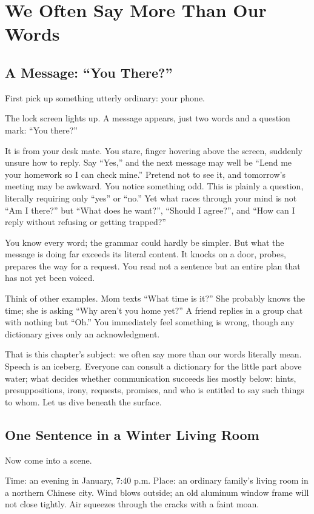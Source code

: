 \chapter{We Often Say More Than Our Words}
\section{A Message: ``You There?''}
First pick up something utterly ordinary: your phone.

The lock screen lights up. A message appears, just two words and a question mark: ``You there?''

It is from your desk mate. You stare, finger hovering above the screen, suddenly unsure how to reply. Say ``Yes,'' and the next message may well be ``Lend me your homework so I can check mine.'' Pretend not to see it, and tomorrow's meeting may be awkward. You notice something odd. This is plainly a question, literally requiring only ``yes'' or ``no.'' Yet what races through your mind is not ``Am I there?'' but ``What does he want?'', ``Should I agree?'', and ``How can I reply without refusing or getting trapped?''

You know every word; the grammar could hardly be simpler. But what the message is doing far exceeds its literal content. It knocks on a door, probes, prepares the way for a request. You read not a sentence but an entire plan that has not yet been voiced.

Think of other examples. Mom texts ``What time is it?'' She probably knows the time; she is asking ``Why aren't you home yet?'' A friend replies in a group chat with nothing but ``Oh.'' You immediately feel something is wrong, though any dictionary gives only an acknowledgment.

That is this chapter's subject: we often say more than our words literally mean. Speech is an iceberg. Everyone can consult a dictionary for the little part above water; what decides whether communication succeeds lies mostly below: hints, presuppositions, irony, requests, promises, and who is entitled to say such things to whom. Let us dive beneath the surface.

\section{One Sentence in a Winter Living Room}
Now come into a scene.

Time: an evening in January, 7:40 p.m. Place: an ordinary family's living room in a northern Chinese city. Wind blows outside; an old aluminum window frame will not close tightly. Air squeezes through the cracks with a faint moan.


